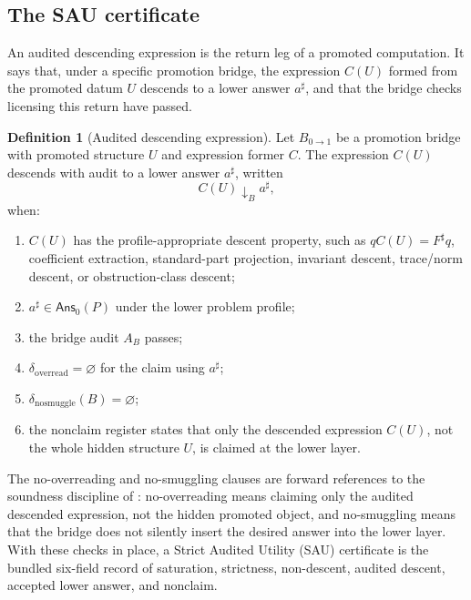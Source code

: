 \documentclass[11pt]{article}
\theoremstyle{definition}
\newtheorem{definition}[theorem]{Definition}
\begin{document}
\subsection{The SAU certificate}
\label{subsec:layers-sau-certificate}

An audited descending expression is the return leg of a promoted computation.
It says that, under a specific promotion bridge, the expression \(C(U)\) formed
from the promoted datum \(U\) descends to a lower answer \(a^\sharp\), and that
the bridge checks licensing this return have passed.

\begin{definition}[Audited descending expression]
\label{def:sau-audited-desc-expression}
Let \(B_{0\to1}\) be a promotion bridge with promoted structure \(U\) and expression former \(C\). The expression \(C(U)\) descends with audit to a lower answer \(a^\sharp\), written
\[
C(U)\downarrow_{B} a^\sharp,
\]
when:
\begin{enumerate}
\item \(C(U)\) has the profile-appropriate descent property, such as \(qC(U)=F^\sharp q\), coefficient extraction, standard-part projection, invariant descent, trace/norm descent, or obstruction-class descent;
\item \(a^\sharp\in\mathsf{Ans}_0(P)\) under the lower problem profile;
\item the bridge audit \(A_B\) passes;
\item \(\delta_{\mathrm{overread}}=\varnothing\) for the claim using \(a^\sharp\);
\item \(\delta_{\mathrm{nosmuggle}}(B)=\varnothing\);
\item the nonclaim register states that only the descended expression \(C(U)\), not the whole hidden structure \(U\), is claimed at the lower layer.
\end{enumerate}
\end{definition}

The no-overreading and no-smuggling clauses are forward references to the
soundness discipline of : no-overreading means
claiming only the audited descended expression, not the hidden promoted object,
and no-smuggling means that the bridge does not silently insert the desired
answer into the lower layer.  With these checks in place, a Strict Audited
Utility (SAU) certificate is the bundled six-field record of saturation,
strictness, non-descent, audited descent, accepted lower answer, and nonclaim.
\end{document}
